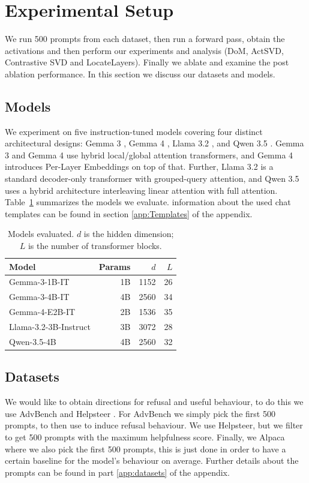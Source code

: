 \section{Experimental Setup}
We run 500 prompts from each dataset, then run a forward pass, obtain the activations
and then perform our experiments and analysis (DoM, ActSVD, Contrastive SVD and LocateLayers).
Finally we ablate and examine the post ablation performance. In this section we discuss
our datasets and models.
\subsection{Models}
We experiment on five instruction-tuned models covering four distinct
architectural designs: Gemma 3 \citep{gemma_2025}, Gemma 4
\citep{gemma4}, Llama 3.2 \citep{grattafiori2024llama3herdmodels}, and
Qwen 3.5 \citep{qwen3.5}. 
Gemma 3 and Gemma 4 use hybrid local/global
attention transformers, and Gemma 4 introduces
Per-Layer Embeddings on top of that. Further, Llama 3.2 is a standard decoder-only transformer
with grouped-query attention, and Qwen 3.5 uses a hybrid architecture
interleaving linear attention with full attention.
Table~\ref{tab:models} summarizes the models we evaluate. information about the used
chat templates can be found in section \ref{app:Templates} of the appendix.

\begin{table}[h]
\centering
\small
\begin{tabular}{lrrr}
\hline
Model & Params & $d$ & $L$ \\
\hline
Gemma-3-1B-IT          & 1B & 1152 & 26 \\
Gemma-3-4B-IT          & 4B & 2560 & 34 \\
Gemma-4-E2B-IT         & 2B & 1536 & 35 \\
Llama-3.2-3B-Instruct  & 3B & 3072 & 28 \\
Qwen-3.5-4B            & 4B & 2560 & 32 \\
\hline
\end{tabular}
\caption{Models evaluated. $d$ is the hidden dimension; $L$ is the number of transformer blocks.}
\label{tab:models}
\end{table}
\subsection{Datasets}
We would like to obtain directions for refusal and useful behaviour, to do this we use
AdvBench \citep{zou2023gcg} and Helpsteer \citep{wang-etal-2024-helpsteer}. 
For AdvBench we simply pick the first 500 prompts, to then use to induce refusal behaviour.
We use Helpsteer, but we filter to get 500 prompts with the maximum helpfulness score. 
Finally, we Alpaca \citep{alpaca} where we also pick the first 500 prompts, this is just 
done in order to have a certain baseline for the model's behaviour on average. Further
details about the prompts can be found in part \ref{app:datasets} of the appendix.
